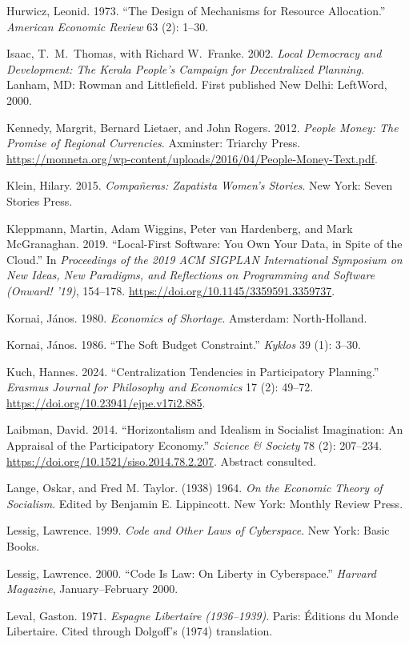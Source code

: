 \documentclass[10pt,twoside,openany]{book}
\theoremstyle{dpepstyle}
\begin{document}
\begin{list}{}{\setlength{\leftmargin}{1.8em}\setlength{\itemindent}{-1.8em}\setlength{\itemsep}{3pt}\setlength{\parsep}{0pt}}
\item Hurwicz, Leonid. 1973. ``The Design of Mechanisms for Resource Allocation.'' \emph{American Economic Review} 63 (2): 1--30.
\item Isaac, T.~M.\ Thomas, with Richard W.\ Franke. 2002. \emph{Local Democracy and Development: The Kerala People's Campaign for Decentralized Planning}. Lanham, MD: Rowman and Littlefield. First published New Delhi: LeftWord, 2000.
\item Kennedy, Margrit, Bernard Lietaer, and John Rogers. 2012. \emph{People Money: The Promise of Regional Currencies}. Axminster: Triarchy Press. \url{https://monneta.org/wp-content/uploads/2016/04/People-Money-Text.pdf}.
\item Klein, Hilary. 2015. \emph{Compa\~neras: Zapatista Women's Stories}. New York: Seven Stories Press.
\item Kleppmann, Martin, Adam Wiggins, Peter van Hardenberg, and Mark McGranaghan. 2019. ``Local-First Software: You Own Your Data, in Spite of the Cloud.'' In \emph{Proceedings of the 2019 ACM SIGPLAN International Symposium on New Ideas, New Paradigms, and Reflections on Programming and Software (Onward! '19)}, 154--178. \url{https://doi.org/10.1145/3359591.3359737}.
\item Kornai, J\'anos. 1980. \emph{Economics of Shortage}. Amsterdam: North-Holland.
\item Kornai, J\'anos. 1986. ``The Soft Budget Constraint.'' \emph{Kyklos} 39 (1): 3--30.
\item Kuch, Hannes. 2024. ``Centralization Tendencies in Participatory Planning.'' \emph{Erasmus Journal for Philosophy and Economics} 17 (2): 49--72. \url{https://doi.org/10.23941/ejpe.v17i2.885}.
\item Laibman, David. 2014. ``Horizontalism and Idealism in Socialist Imagination: An Appraisal of the Participatory Economy.'' \emph{Science \& Society} 78 (2): 207--234. \url{https://doi.org/10.1521/siso.2014.78.2.207}. Abstract consulted.
\item Lange, Oskar, and Fred M. Taylor. (1938) 1964. \emph{On the Economic Theory of Socialism}. Edited by Benjamin E. Lippincott. New York: Monthly Review Press.
\item Lessig, Lawrence. 1999. \emph{Code and Other Laws of Cyberspace}. New York: Basic Books.
\item Lessig, Lawrence. 2000. ``Code Is Law: On Liberty in Cyberspace.'' \emph{Harvard Magazine}, January--February 2000.
\item Leval, Gaston. 1971. \emph{Espagne Libertaire (1936--1939)}. Paris: \'Editions du Monde Libertaire. Cited through Dolgoff's (1974) translation.

\end{list}
\end{document}
